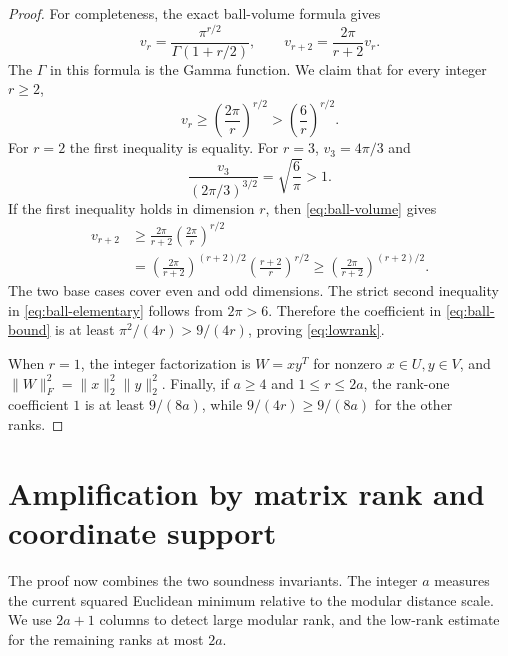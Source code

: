\documentclass[11pt,letterpaper]{article}
\numberwithin{equation}{section}
\theoremstyle{definition}
\theoremstyle{remark}
\begin{document}
\begin{proof}
For completeness, the exact ball-volume formula gives
\begin{equation}\label{eq:ball-volume}
 v_r=\frac{\pi^{r/2}}{\Gamma(1+r/2)},
 \qquad v_{r+2}=\frac{2\pi}{r+2}v_r.
\end{equation}
The $\Gamma$ in this formula is the Gamma function. We claim that for every integer $r\ge2$,
\begin{equation}\label{eq:ball-elementary}
 v_r\ge\left(\frac{2\pi}{r}\right)^{r/2}
       >\left(\frac6r\right)^{r/2}.
\end{equation}
For $r=2$ the first inequality is equality. For $r=3$, $v_3=4\pi/3$ and
\[
 \frac{v_3}{(2\pi/3)^{3/2}}=\sqrt{\frac6\pi}>1.
\]
If the first inequality holds in dimension $r$, then \eqref{eq:ball-volume} gives
\[
\begin{aligned}
 v_{r+2}
 &\ge\frac{2\pi}{r+2}\left(\frac{2\pi}{r}\right)^{r/2}\\
 &=\left(\frac{2\pi}{r+2}\right)^{(r+2)/2}
     \left(\frac{r+2}{r}\right)^{r/2}
 \ge\left(\frac{2\pi}{r+2}\right)^{(r+2)/2}.
\end{aligned}
\]
The two base cases cover even and odd dimensions. The strict second inequality in \eqref{eq:ball-elementary} follows from $2\pi>6$. Therefore the coefficient in \eqref{eq:ball-bound} is at least $\pi^2/(4r)>9/(4r)$, proving \eqref{eq:lowrank}.

When $r=1$, the integer factorization is $W=xy^T$ for nonzero $x\in U,y\in V$, and $\|W\|_F^2=\|x\|_2^2\|y\|_2^2$. Finally, if $a\ge4$ and $1\le r\le2a$, the rank-one coefficient $1$ is at least $9/(8a)$, while $9/(4r)\ge9/(8a)$ for the other ranks.
\end{proof}

\section{Amplification by matrix rank and coordinate support}\label{sec:amplification}
The proof now combines the two soundness invariants. The integer $a$ measures the current squared Euclidean minimum relative to the modular distance scale. We use $2a+1$ columns to detect large modular rank, and the low-rank estimate for the remaining ranks at most $2a$.
\end{document}
